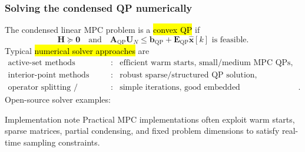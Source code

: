 \begin{frame}
	\frametitle{Solving the condensed QP numerically}
	The condensed linear MPC problem is a \hl{convex QP} if
	\begin{equation}
		\bm{H}\succeq\bm{0}
		\quad\text{and}\quad
		\bm{A}_{\mathrm{QP}}\bm{U}_{N}\leq \bm{b}_{\mathrm{QP}}+\bm{E}_{\mathrm{QP}}\hat{\bm{x}}[k]
		\text{ is feasible.}
	\end{equation}\pause%
	Typical \hl{numerical solver approaches} are
	\begin{equation*}
		\begin{array}{rcl}
			\text{active-set methods}        & : & \text{efficient warm starts, small/medium MPC QPs},      \\[1mm]
			\text{interior-point methods}    & : & \text{robust sparse/structured QP solution},             \\[1mm]
			\text{operator splitting / ADMM} & : & \text{simple iterations, good embedded implementations}.
		\end{array}
	\end{equation*}\pause%
	Open-source solver examples:
	\begin{center}
	\end{center}\pause%
	\begin{block}{Implementation note}
		Practical MPC implementations often exploit warm starts, sparse matrices, partial condensing, and fixed problem dimensions to satisfy real-time sampling constraints.
	\end{block}
\end{frame}

